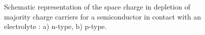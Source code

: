\begin{figure}[H]
\centering

\caption{Schematic representation of the space charge in depletion of majority charge carriers for 
a semiconductor in contact with an electrolyte \citep{memming2008-1,bard2002-1}:
 a) n-type, b) p-type.}
\label{fig_space_charge_depletion}
\end{figure}